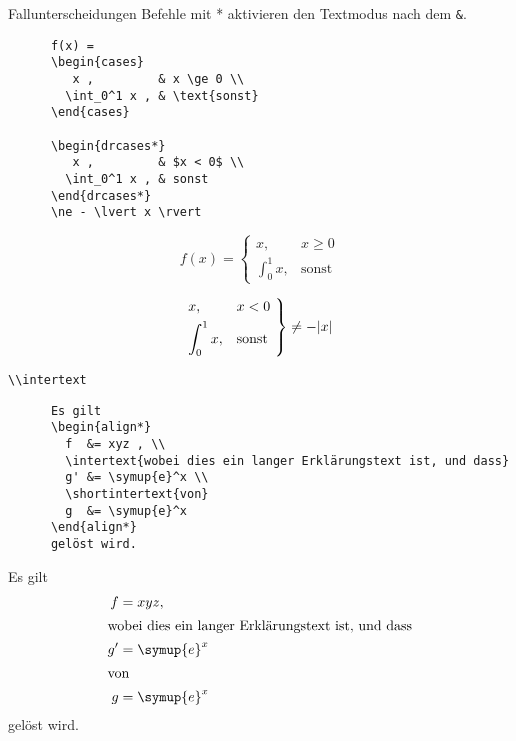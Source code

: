 \begin{frame}[fragile]{Fallunterscheidungen}
  Befehle mit * aktivieren den Textmodus nach dem \lstinline+&+.
  \begin{CodeExample}{0.55}
    \begin{lstlisting}
      f(x) =
      \begin{cases}
         x ,         & x \ge 0 \\
        \int_0^1 x , & \text{sonst}
      \end{cases}

      \begin{drcases*}
         x ,         & $x < 0$ \\
        \int_0^1 x , & sonst
      \end{drcases*}
      \ne - \lvert x \rvert
    \end{lstlisting}
  \CodeResult
    \removedisplayskip
    \begin{equation*}
      f(x) =
      \begin{cases}
         x ,         & x \ge 0 \\
        \int_0^1 x , & \text{sonst}
      \end{cases}
    \end{equation*}

    \vspace{3em}
    \begin{equation*}
      \begin{drcases*}
         x ,         & $x < 0$ \\
        \int_0^1 x , & sonst
      \end{drcases*}
      \ne - \lvert x \rvert
    \end{equation*}
  \end{CodeExample}
\end{frame}

\begin{frame}[fragile]{\lstinline+\\intertext+}
  \begin{CodeExample}{0.60}
    \begin{lstlisting}
      Es gilt
      \begin{align*}
        f  &= xyz , \\
        \intertext{wobei dies ein langer Erklärungstext ist, und dass}
        g' &= \symup{e}^x \\
        \shortintertext{von}
        g  &= \symup{e}^x
      \end{align*}
      gelöst wird.
    \end{lstlisting}
  \CodeResult
    Es gilt
    \begin{align*}
      f  &= xyz , \\
      \intertext{wobei dies ein langer Erklärungstext ist, und dass}
      g' &= \symup{e}^x \\
      \shortintertext{von}
      g  &= \symup{e}^x
    \end{align*}
    gelöst wird.
  \end{CodeExample}
\end{frame}

